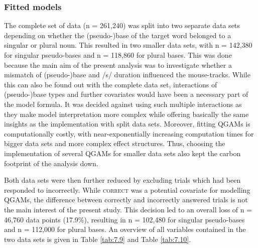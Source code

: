 \subsubsection{Fitted models}\label{section07_2_3_1}

The complete set of data (n = 261,240) was split into two separate data sets depending on whether the (pseudo-)base of the target word belonged to a singular or plural noun. This resulted in two smaller data sets, with n = 142,380 for singular pseudo-bases and n = 118,860 for plural bases. This was done because the main aim of the present analysis was to investigate whether a mismatch of (pseudo-)base and /s/ duration influenced the mouse-tracks. While this can also be found out with the complete data set, interactions of (pseudo-)base types and further covariates would have been a necessary part of the model formula. It was decided against using such multiple interactions as they make model interpretation more complex while offering basically the same insights as the implementation with split data sets. Moreover, fitting QGAMs is computationally costly, with near-exponentially increasing computation times for bigger data sets and more complex effect structures. Thus, choosing the implementation of several QGAMs for smaller data sets also kept the carbon footprint of the analysis down.

Both data sets were then further reduced by excluding trials which had been responded to incorrectly. While \textsc{correct} was a potential covariate for modelling QGAMs, the difference between correctly and incorrectly answered trials is not the main interest of the present study. This decision led to an overall loss of n = 46,760 data points (17.9\%), resulting in n = 102,480 for singular pseudo-bases and n = 112,000 for plural bases. An overview of all variables contained in the two data sets is given in Table \ref{tab:7.9} and Table \ref{tab:7.10}.

